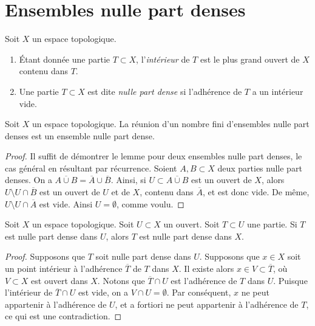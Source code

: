\section{Ensembles nulle part denses}
\label{section-nowhere-dense}

\begin{definition}
\label{definition-nowhere-dense}
Soit $X$ un espace topologique.
\begin{enumerate}
\item Étant donnée une partie $T \subset X$, l'{\it intérieur} de $T$ est le
plus grand ouvert de $X$ contenu dans $T$.
\item Une partie $T \subset X$ est dite {\it nulle part dense} si l'adhérence
de $T$ a un intérieur vide.
\end{enumerate}
\end{definition}

\begin{lemma}
\label{lemma-nowhere-dense}
Soit $X$ un espace topologique. La réunion d'un nombre fini d'ensembles nulle
part denses est un ensemble nulle part dense.
\end{lemma}

\begin{proof}
Il suffit de démontrer le lemme pour deux ensembles nulle part denses, le cas
général en résultant par récurrence. Soient $A,B \subset X$ deux parties nulle
part denses. On a $\overline{A \cup B} = \overline{A} \cup \overline{B}$.
Ainsi, si $U \subset \overline{A \cup B}$ est un ouvert de $X$, alors
$U \setminus U \cap \overline{B}$ est un ouvert de $U$ et de $X$,
contenu dans $\overline{A}$, et est donc vide. De même,
$U \setminus U \cap \overline{A}$ est vide. Ainsi $U = \emptyset$,
comme voulu.
\end{proof}

\begin{lemma}
\label{lemma-image-nowhere-dense-open}
Soit $X$ un espace topologique.
Soit $U \subset X$ un ouvert.
Soit $T \subset U$ une partie.
Si $T$ est nulle part dense dans $U$, alors $T$ est nulle part dense dans $X$.
\end{lemma}

\begin{proof}
Supposons que $T$ soit nulle part dense dans $U$.
Supposons que $x \in X$ soit un point intérieur à l'adhérence
$\overline{T}$ de $T$ dans $X$. Il existe alors
$x \in V \subset \overline{T}$, où $V \subset X$ est ouvert dans $X$.
Notons que $\overline{T} \cap U$ est
l'adhérence de $T$ dans $U$. Puisque l'intérieur de
$\overline{T} \cap U$ est vide, on a $V \cap U = \emptyset$. Par conséquent,
$x$ ne peut appartenir à l'adhérence de $U$, et a fortiori ne peut appartenir
à l'adhérence de $T$, ce qui est une contradiction.
\end{proof}

